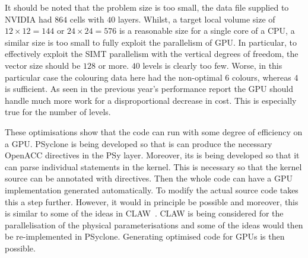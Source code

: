 It should be noted that the problem size is too small, the data file
supplied to NVIDIA had $864$ cells with $40$ layers. Whilst, a target
local volume size of $12\times 12=144$ or $24\times 24=576$ is a
reasonable size for a single core of a CPU, a similar size is too
small to fully exploit the parallelism of GPU. In particular, to
effectively exploit the SIMT parallelism with the vertical degrees of
freedom, the vector size should be $128$ or more. $40$ levels is
clearly too few. Worse, in this particular case the colouring data here
had the non-optimal $6$ colours, whereas $4$ is sufficient. As seen in
the previous year's performance report the GPU should handle much more
work for a disproportional decrease in cost. This is especially true
for the number of levels.

These optimisations show that the code can run with some degree of
efficiency on a GPU. PSyclone is being developed so that is can
produce the necessary OpenACC directives in the PSy layer. Moreover,
its is being developed so that it can parse individual statements in
the kernel. This is necessary so that the kernel source can be
annotated with directives. Then the whole code can have a GPU
implementation generated automatically. To modify the actual source
code takes this a step further. However, it would in principle be
possible and moreover, this is similar to some of the ideas in CLAW~\cite{claw}.
CLAW is being considered for the parallelisation of the physical
parameterisations and some of the ideas would then be re-implemented in
PSyclone. Generating optimised code for GPUs is then possible.

